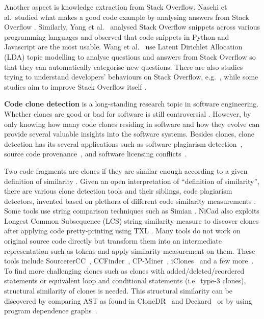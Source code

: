 \documentclass{sig-alternate-05-2015}
\begin{document}
Another aspect is knowledge extraction from Stack Overflow. Nasehi et al.~studied what makes a good code example by analysing answers from Stack Overflow \cite{Nasehi2012}. Similarly, Yang et al.~\cite{Yang2016} analysed Stack Overflow snippets across various programming languages and observed that code snippets in Python and Javascript are the most usable. Wang et al.~\cite{Wang2013_StackOverflow} use Latent Dirichlet Allocation (LDA) topic modelling to analyse questions and answers from Stack Overflow so that they can automatically categorise new questions. There are also studies trying to understand developers' behaviours on Stack Overflow, e.g.~\cite{Movshovitz-Attias2013,Rosen2016,Choetkiertikul2015,Bosu2013}, while some studies aim to improve Stack Overflow itself \cite{Diamantopoulos2015, Wang2014}. 

\textbf{Code clone detection} is a long-standing research topic in software engineering. Whether clones are good or bad for software is still controversial \cite{Sajnani2016,Kapser2003,Kapser2008,Krinke2008,Hotta2010,Gode2011,Harder2013}. However, by only knowing how many code clones residing in software and how they evolve \cite{Pate2013,Mondal2011} can provide several valuable insights into the software systems. Besides clones, clone detection has its several applications such as software plagiarism detection~\cite{Prechelt2002}, 
source code provenance~\cite{Davies2013}, and software licensing conflicts~\cite{German2009}.

Two code fragments are clones if they are similar enough according to a given definition of similarity \cite{Bellon2007}. Given an open interpretation of ``definition of similarity'', there are various clone detection tools and their siblings, code plagiarism detectors, invented based on plethora of different code similarity measurements \cite{Roy2008, Ragkhitwetsagul2016,Svajlenko2014}. Some tools
use string comparison techniques such as Simian \cite{simian}. NiCad \cite{Roy2008,Cordy} also exploits Longest Common Subsequence (LCS) string similarity measure to discover clones after applying code pretty-printing using TXL \cite{Cordy2006}. Many tools do not work on original source code directly but transform them into an
intermediate representation such as tokens and apply similarity
measurement on them. These tools include SourcererCC~\cite{Sajnani2016}, CCFinder~\cite{Kamiya2002},
CP-Miner~\cite{Li2006}, iClones~\cite{Gode2009} and a few more~\cite{Burrows2007, Smith2009, Duric2012, Prechelt2002, Schleimer2003}. 
To find more challenging clones such as clones with added/deleted/reordered statements or equivalent loop and conditional statements (i.e.~type-3 clones), structural similarity of clones is needed.
This structural similarity can be discovered by comparing AST as found in CloneDR~\cite{Baxter1998} and Deckard~\cite{Jiang2007a} or by using program dependence
graphs~\cite{Krinke2001,Komondoor2001}. 
\end{document}
